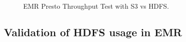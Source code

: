 \begin{figure}
   \begin{center}
   \end{center}
   \caption{EMR Presto Throughput Test with S3 vs HDFS.}
   \label{fig:additionalResultsPrestoHDFSvsS3TputTestTotalTime}
\end{figure}

\subsection{Validation of HDFS usage in EMR}
